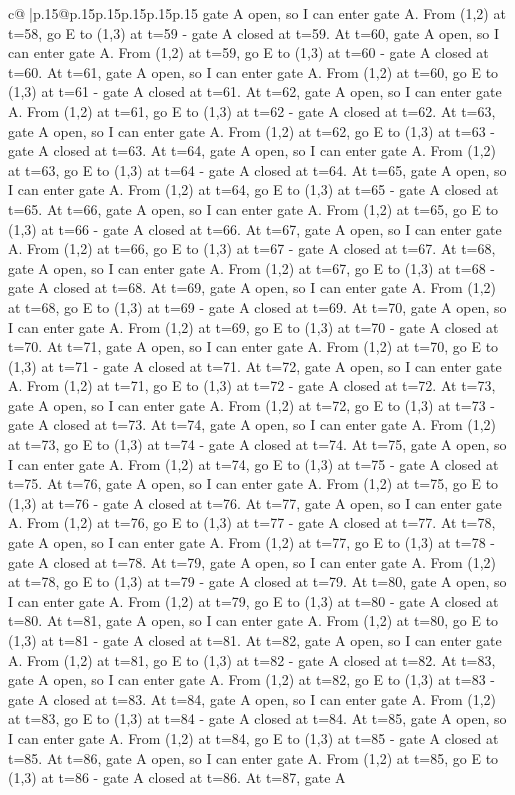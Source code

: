 \documentclass{article}
\begin{document}
{\begin{supertabular}{c@{$\;$}|p{.15\linewidth}@{}p{.15\linewidth}p{.15\linewidth}p{.15\linewidth}p{.15\linewidth}p{.15\linewidth}}
{{{gate A open, so I can enter gate A. From (1,2) at t=58, go E to (1,3) at t=59 {-} gate A closed at t=59. At t=60, gate A open, so I can enter gate A. From (1,2) at t=59, go E to (1,3) at t=60 {-} gate A closed at t=60. At t=61, gate A open, so I can enter gate A. From (1,2) at t=60, go E to (1,3) at t=61 {-} gate A closed at t=61. At t=62, gate A open, so I can enter gate A. From (1,2) at t=61, go E to (1,3) at t=62 {-} gate A closed at t=62. At t=63, gate A open, so I can enter gate A. From (1,2) at t=62, go E to (1,3) at t=63 {-} gate A closed at t=63. At t=64, gate A open, so I can enter gate A. From (1,2) at t=63, go E to (1,3) at t=64 {-} gate A closed at t=64. At t=65, gate A open, so I can enter gate A. From (1,2) at t=64, go E to (1,3) at t=65 {-} gate A closed at t=65. At t=66, gate A open, so I can enter gate A. From (1,2) at t=65, go E to (1,3) at t=66 {-} gate A closed at t=66. At t=67, gate A open, so I can enter gate A. From (1,2) at t=66, go E to (1,3) at t=67 {-} gate A closed at t=67. At t=68, gate A open, so I can enter gate A. From (1,2) at t=67, go E to (1,3) at t=68 {-} gate A closed at t=68. At t=69, gate A open, so I can enter gate A. From (1,2) at t=68, go E to (1,3) at t=69 {-} gate A closed at t=69. At t=70, gate A open, so I can enter gate A. From (1,2) at t=69, go E to (1,3) at t=70 {-} gate A closed at t=70. At t=71, gate A open, so I can enter gate A. From (1,2) at t=70, go E to (1,3) at t=71 {-} gate A closed at t=71. At t=72, gate A open, so I can enter gate A. From (1,2) at t=71, go E to (1,3) at t=72 {-} gate A closed at t=72. At t=73, gate A open, so I can enter gate A. From (1,2) at t=72, go E to (1,3) at t=73 {-} gate A closed at t=73. At t=74, gate A open, so I can enter gate A. From (1,2) at t=73, go E to (1,3) at t=74 {-} gate A closed at t=74. At t=75, gate A open, so I can enter gate A. From (1,2) at t=74, go E to (1,3) at t=75 {-} gate A closed at t=75. At t=76, gate A open, so I can enter gate A. From (1,2) at t=75, go E to (1,3) at t=76 {-} gate A closed at t=76. At t=77, gate A open, so I can enter gate A. From (1,2) at t=76, go E to (1,3) at t=77 {-} gate A closed at t=77. At t=78, gate A open, so I can enter gate A. From (1,2) at t=77, go E to (1,3) at t=78 {-} gate A closed at t=78. At t=79, gate A open, so I can enter gate A. From (1,2) at t=78, go E to (1,3) at t=79 {-} gate A closed at t=79. At t=80, gate A open, so I can enter gate A. From (1,2) at t=79, go E to (1,3) at t=80 {-} gate A closed at t=80. At t=81, gate A open, so I can enter gate A. From (1,2) at t=80, go E to (1,3) at t=81 {-} gate A closed at t=81. At t=82, gate A open, so I can enter gate A. From (1,2) at t=81, go E to (1,3) at t=82 {-} gate A closed at t=82. At t=83, gate A open, so I can enter gate A. From (1,2) at t=82, go E to (1,3) at t=83 {-} gate A closed at t=83. At t=84, gate A open, so I can enter gate A. From (1,2) at t=83, go E to (1,3) at t=84 {-} gate A closed at t=84. At t=85, gate A open, so I can enter gate A. From (1,2) at t=84, go E to (1,3) at t=85 {-} gate A closed at t=85. At t=86, gate A open, so I can enter gate A. From (1,2) at t=85, go E to (1,3) at t=86 {-} gate A closed at t=86. At t=87, gate A }}}
\end{supertabular}}
\end{document}
